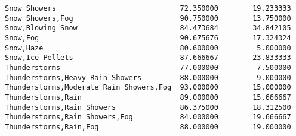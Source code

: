 \documentclass[11pt]{article}
\begin{document}
\begin{tcolorbox}[breakable, size=fbox, boxrule=.5pt, pad at break*=1mm, opacityfill=0]
\begin{Verbatim}[commandchars=\\\{\}]
Snow Showers                             72.350000        19.233333
Snow Showers,Fog                         90.750000        13.750000
Snow,Blowing Snow                        84.473684        34.842105
Snow,Fog                                 90.675676        17.324324
Snow,Haze                                80.600000         5.000000
Snow,Ice Pellets                         87.666667        23.833333
Thunderstorms                            77.000000         7.500000
Thunderstorms,Heavy Rain Showers         88.000000         9.000000
Thunderstorms,Moderate Rain Showers,Fog  93.000000        15.000000
Thunderstorms,Rain                       89.000000        15.666667
Thunderstorms,Rain Showers               86.375000        18.312500
Thunderstorms,Rain Showers,Fog           84.000000        19.666667
Thunderstorms,Rain,Fog                   88.000000        19.000000


\end{Verbatim}
\end{tcolorbox}
\end{document}
